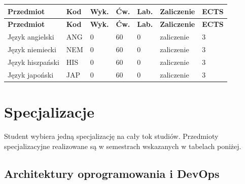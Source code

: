 \documentclass[12pt,a4paper]{article}
\newcommand{\thdrule}{\noalign{\global\setlength{\extrarowheight}{0pt}}}
\newcommand{\thdend}{\noalign{\global\setlength{\extrarowheight}{4pt}}}
\begin{document}
{\scriptsize
\begin{longtable}{m{5.5cm}m{0.8cm}m{1cm}m{1cm}m{1cm}m{1.7cm}m{0.7cm}}
\thdrule\toprule
\rowcolor{pjatkRed}
{\color{white}\footnotesize\textbf{\vphantom{Ag}Przedmiot}} & {\color{white}\footnotesize\textbf{\vphantom{Ag}Kod}} & {\color{white}\footnotesize\textbf{\vphantom{Ag}Wyk.}} & {\color{white}\footnotesize\textbf{\vphantom{Ag}Ćw.}} & {\color{white}\footnotesize\textbf{\vphantom{Ag}Lab.}} & {\color{white}\footnotesize\textbf{\vphantom{Ag}Zaliczenie}} & {\color{white}\footnotesize\textbf{\vphantom{Ag}ECTS}} \\
\midrule\thdend
\endfirsthead
\thdrule\toprule
\rowcolor{pjatkRed}
{\color{white}\footnotesize\textbf{\vphantom{Ag}Przedmiot}} & {\color{white}\footnotesize\textbf{\vphantom{Ag}Kod}} & {\color{white}\footnotesize\textbf{\vphantom{Ag}Wyk.}} & {\color{white}\footnotesize\textbf{\vphantom{Ag}Ćw.}} & {\color{white}\footnotesize\textbf{\vphantom{Ag}Lab.}} & {\color{white}\footnotesize\textbf{\vphantom{Ag}Zaliczenie}} & {\color{white}\footnotesize\textbf{\vphantom{Ag}ECTS}} \\
\midrule\thdend
\endhead
\rowcolor{tableRowLight} Język angielski & ANG & 0 & 60 & 0 & {\scriptsize zaliczenie} & 3 \\
\rowcolor{tableRowAlt} Język niemiecki & NEM & 0 & 60 & 0 & {\scriptsize zaliczenie} & 3 \\
\rowcolor{tableRowLight} Język hiszpański & HIS & 0 & 60 & 0 & {\scriptsize zaliczenie} & 3 \\
\rowcolor{tableRowAlt} Język japoński & JAP & 0 & 60 & 0 & {\scriptsize zaliczenie} & 3 \\
\bottomrule
\end{longtable}}



\newpage

\section{Specjalizacje}

Student wybiera jedną specjalizację na cały tok studiów. Przedmioty specjalizacyjne realizowane są w semestrach wskazanych w tabelach poniżej.

\subsection*{Architektury oprogramowania i DevOps}
\end{document}

